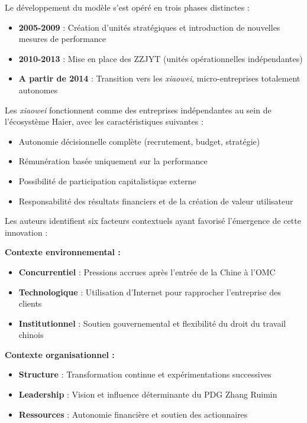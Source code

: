 \documentclass{rapportECL}
\begin{document}
Le développement du modèle s'est opéré en trois phases distinctes :
\begin{itemize}
\item \textbf{2005-2009} : Création d'unités stratégiques et introduction de nouvelles mesures de performance
\item \textbf{2010-2013} : Mise en place des ZZJYT (unités opérationnelles indépendantes)
\item \textbf{A partir de 2014} : Transition vers les \textit{xiaowei}, micro-entreprises totalement autonomes
\end{itemize}

Les \textit{xiaowei} fonctionnent comme des entreprises indépendantes au sein de l'écosystème Haier, avec les caractéristiques suivantes :
\begin{itemize}
\item Autonomie décisionnelle complète (recrutement, budget, stratégie)
\item Rémunération basée uniquement sur la performance
\item Possibilité de participation capitalistique externe
\item Responsabilité des résultats financiers et de la création de valeur utilisateur
\end{itemize}

Les auteurs identifient six facteurs contextuels ayant favorisé l'émergence de cette innovation :

\textbf{Contexte environnemental :}
\begin{itemize}
\item \textbf{Concurrentiel} : Pressions accrues après l'entrée de la Chine à l'OMC
\item \textbf{Technologique} : Utilisation d'Internet pour rapprocher l'entreprise des clients
\item \textbf{Institutionnel} : Soutien gouvernemental et flexibilité du droit du travail chinois
\end{itemize}

\textbf{Contexte organisationnel :}
\begin{itemize}
\item \textbf{Structure} : Transformation continue et expérimentations successives
\item \textbf{Leadership} : Vision et influence déterminante du PDG Zhang Ruimin
\item \textbf{Ressources} : Autonomie financière et soutien des actionnaires
\end{itemize}
\end{document}
